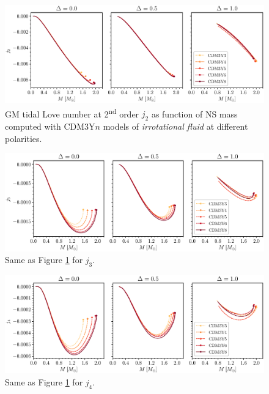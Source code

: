 \begin{figure}[ht!]
        \centering
        \includegraphics[width=\textwidth]{fig/j2_irrot.eps}
        \caption{\gls{GM} tidal Love number at 2\textsuperscript{nd} order $j_2$ as function of \gls{NS} mass computed with CDM3Y$n$ models of \emph{irrotational fluid} at different polarities.}
        \label{fig:j2_irrot}
\end{figure} 
\begin{figure}[ht!]
        \centering
        \includegraphics[width=\textwidth]{fig/j3_irrot.eps}
        \caption{Same as Figure \ref{fig:j2_irrot} for $j_3$.}
        \label{fig:j3_irrot}
\end{figure} 
\begin{figure}[ht!]
        \centering
        \includegraphics[width=\textwidth]{fig/j4_irrot.eps}
        \caption{Same as Figure \ref{fig:j2_irrot} for $j_4$.}
        \label{fig:j4_irrot}
\end{figure} 
